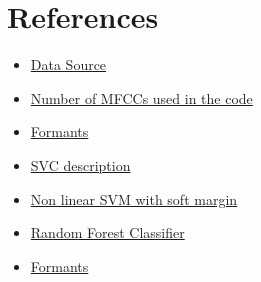 \documentclass{article}
\begin{document}
\section*{References}
\begin{itemize}
    \item \href{https://huggingface.co/datasets/common_language}{Data Source}
    
    \item \href{https://ietresearch.onlinelibrary.wiley.com/doi/full/10.1049/tje2.12082#:~:text=All\%20performance\%20metrics\%20gave\%20the,studies\%20use\%20only\%2013\%20MFCCs}{Number of MFCCs used in the code}

    \item \href{https://corpus.eduhk.hk/english_pronunciation/index.php/2-2-formants-of-vowels/}{Formants}
    \item \href{https://scikit-learn.org/stable/modules/generated/sklearn.svm.SVC.html}{SVC description}
    
    \item \href{https://scikit-learn.org/stable/modules/svm.html#svm-kernels}{Non linear SVM with soft margin}
    
    \item \href{https://scikit-learn.org/stable/modules/generated/sklearn.ensemble.RandomForestClassifier.html}{Random Forest Classifier}
    \item \href{}{Formants}
\end{itemize}
\end{document}
